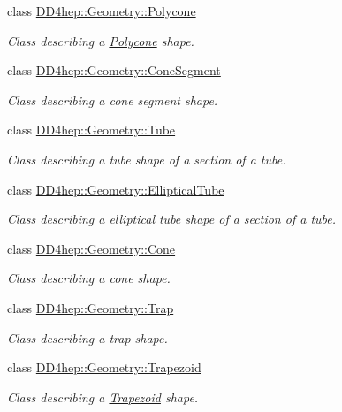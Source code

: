 \begin{DoxyCompactItemize}
class \hyperlink{class_d_d4hep_1_1_geometry_1_1_polycone}{D\+D4hep\+::\+Geometry\+::\+Polycone}
\begin{DoxyCompactList}\small\item\em Class describing a \hyperlink{class_d_d4hep_1_1_geometry_1_1_polycone}{Polycone} shape. \end{DoxyCompactList}\item 
class \hyperlink{class_d_d4hep_1_1_geometry_1_1_cone_segment}{D\+D4hep\+::\+Geometry\+::\+Cone\+Segment}
\begin{DoxyCompactList}\small\item\em Class describing a cone segment shape. \end{DoxyCompactList}\item 
class \hyperlink{class_d_d4hep_1_1_geometry_1_1_tube}{D\+D4hep\+::\+Geometry\+::\+Tube}
\begin{DoxyCompactList}\small\item\em Class describing a tube shape of a section of a tube. \end{DoxyCompactList}\item 
class \hyperlink{class_d_d4hep_1_1_geometry_1_1_elliptical_tube}{D\+D4hep\+::\+Geometry\+::\+Elliptical\+Tube}
\begin{DoxyCompactList}\small\item\em Class describing a elliptical tube shape of a section of a tube. \end{DoxyCompactList}\item 
class \hyperlink{class_d_d4hep_1_1_geometry_1_1_cone}{D\+D4hep\+::\+Geometry\+::\+Cone}
\begin{DoxyCompactList}\small\item\em Class describing a cone shape. \end{DoxyCompactList}\item 
class \hyperlink{class_d_d4hep_1_1_geometry_1_1_trap}{D\+D4hep\+::\+Geometry\+::\+Trap}
\begin{DoxyCompactList}\small\item\em Class describing a trap shape. \end{DoxyCompactList}\item 
class \hyperlink{class_d_d4hep_1_1_geometry_1_1_trapezoid}{D\+D4hep\+::\+Geometry\+::\+Trapezoid}
\begin{DoxyCompactList}\small\item\em Class describing a \hyperlink{class_d_d4hep_1_1_geometry_1_1_trapezoid}{Trapezoid} shape. \end{DoxyCompactList}\item 

\end{DoxyCompactItemize}
